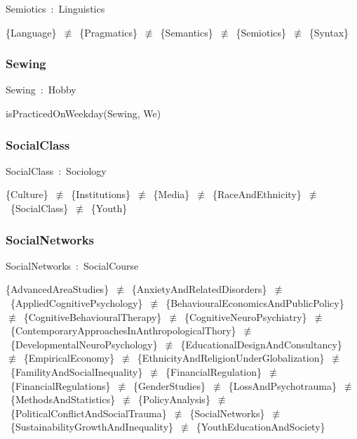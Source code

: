 \documentclass{article}
\begin{document}
Semiotics~:~Linguistics

\{Language\}~\ensuremath{\not\equiv}~\{Pragmatics\}~\ensuremath{\not\equiv}~\{Semantics\}~\ensuremath{\not\equiv}~\{Semiotics\}~\ensuremath{\not\equiv}~\{Syntax\}

\subsubsection*{Sewing}

Sewing~:~Hobby

isPracticedOnWeekday(Sewing, We)

\subsubsection*{SocialClass}

SocialClass~:~Sociology

\{Culture\}~\ensuremath{\not\equiv}~\{Institutions\}~\ensuremath{\not\equiv}~\{Media\}~\ensuremath{\not\equiv}~\{RaceAndEthnicity\}~\ensuremath{\not\equiv}~\{SocialClass\}~\ensuremath{\not\equiv}~\{Youth\}

\subsubsection*{SocialNetworks}

SocialNetworks~:~SocialCourse

\{AdvancedAreaStudies\}~\ensuremath{\not\equiv}~\{AnxietyAndRelatedDisorders\}~\ensuremath{\not\equiv}~\{AppliedCognitivePsychology\}~\ensuremath{\not\equiv}~\{BehaviouralEconomicsAndPublicPolicy\}~\ensuremath{\not\equiv}~\{CognitiveBehaviouralTherapy\}~\ensuremath{\not\equiv}~\{CognitiveNeuroPsychiatry\}~\ensuremath{\not\equiv}~\{ContemporaryApproachesInAnthropologicalThory\}~\ensuremath{\not\equiv}~\{DevelopmentalNeuroPsychology\}~\ensuremath{\not\equiv}~\{EducationalDesignAndConsultancy\}~\ensuremath{\not\equiv}~\{EmpiricalEconomy\}~\ensuremath{\not\equiv}~\{EthnicityAndReligionUnderGlobalization\}~\ensuremath{\not\equiv}~\{FamilityAndSocialInequality\}~\ensuremath{\not\equiv}~\{FinancialRegulation\}~\ensuremath{\not\equiv}~\{FinancialRegulations\}~\ensuremath{\not\equiv}~\{GenderStudies\}~\ensuremath{\not\equiv}~\{LossAndPsychotrauma\}~\ensuremath{\not\equiv}~\{MethodsAndStatistics\}~\ensuremath{\not\equiv}~\{PolicyAnalysis\}~\ensuremath{\not\equiv}~\{PoliticalConflictAndSocialTrauma\}~\ensuremath{\not\equiv}~\{SocialNetworks\}~\ensuremath{\not\equiv}~\{SustainabilityGrowthAndInequality\}~\ensuremath{\not\equiv}~\{YouthEducationAndSociety\}
\end{document}
